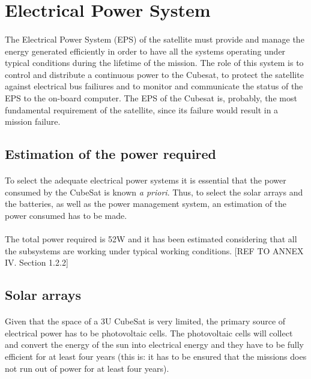 \section{Electrical Power System}

\paragraph{}The Electrical Power System (EPS) of the satellite must provide and manage the energy generated efficiently in order to have all the systems operating under typical conditions during the lifetime of the mission. The role of this system is to control and distribute a continuous power to the Cubesat, to protect the satellite against electrical bus failiures and to monitor and communicate the status of the EPS to the on-board computer. The EPS of the Cubesat is, probably, the most fundamental requirement of the satellite, since its failure would result in a mission failure. 

\subsection{Estimation of the power required}
\paragraph{}To select the adequate electrical power systems it is essential that the power consumed by the CubeSat is known \textit{a priori}. Thus, to select the solar arrays and the batteries, as well as the power management system, an estimation of the power consumed has to be made.

\paragraph{}The total power required is 52W and it has been estimated considering that all the subsystems are working under typical working conditions. [{REF TO ANNEX IV. Section 1.2.2}]

\subsection{Solar arrays}
\paragraph{}Given that the space of a 3U CubeSat is very limited, the primary source of electrical power has to be photovoltaic cells. The photovoltaic cells will collect and convert the energy of the sun into electrical energy and they have to be fully efficient for at least four years (this is: it has to be ensured that the missions does not run out of power for at least four years). 

